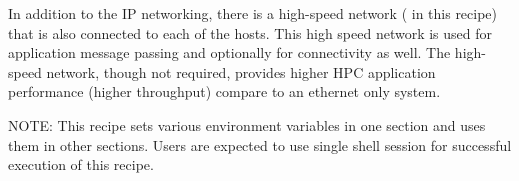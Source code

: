  In addition to the IP networking, there is a high-speed network
(\InfiniBand{} in this recipe) that is also connected to each of the
hosts. This high speed network is used for application message passing and
optionally for \Lustre{} connectivity as well. The high-speed network, though not required, provides higher HPC application performance (higher throughput) compare to an ethernet only system.

NOTE: This recipe sets various environment variables in one section and uses them in other sections. Users are expected to use single shell session for successful execution of this recipe. 


